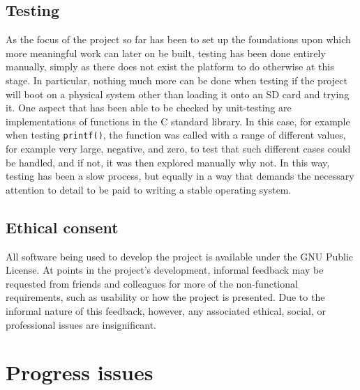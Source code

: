 \documentclass[10pt,a4paper]{article}
\newcommand{\code}[1]{\texttt{#1}}
\begin{document}
\subsection*{Testing}
As the focus of the project so far has been to set up the foundations upon which
more meaningful work can later on be built, testing has been done entirely
manually, simply as there does not exist the platform to do otherwise at this
stage. In particular, nothing much more can be done when testing if the project
will boot on a physical system other than loading it onto an SD card and
trying it. One aspect that has been able to be checked by unit-testing are
implementations of functions in the C standard library. In this case, for
example when testing \code{printf()}, the function was called with a range of
different values, for example very large, negative, and zero, to test that such
different cases could be handled, and if not, it was then explored manually why
not. In this way, testing has been a slow process, but equally in a way that
demands the necessary attention to detail to be paid to writing a stable
operating system.

\subsection*{Ethical consent}
All software being used to develop the project is available under the GNU Public
License. At points in the project's development, informal feedback may be
requested from friends and colleagues for more of the non-functional
requirements, such as usability or how the project is presented. Due to the
informal nature of this feedback, however, any associated ethical, social, or
professional issues are insignificant.

\section*{Progress issues}
\end{document}
